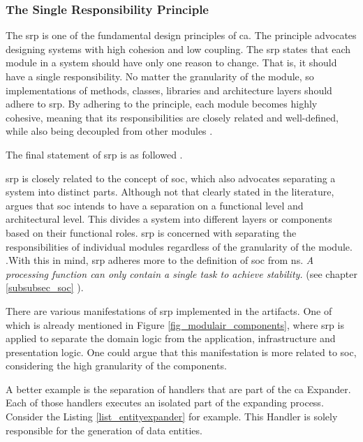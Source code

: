 \subsubsection{The Single Responsibility Principle} \label{subsubsec_srp}

The \gls{srp} is one of the fundamental design principles of \gls{ca}. The principle
advocates designing systems with high cohesion and low coupling. The \gls{srp} states that
each module in a system should have only one reason to change. That is, it should have a
single responsibility. No matter the granularity of the module, so implementations of
methods, classes, libraries and architecture layers should adhere to \gls{srp}. By
adhering to the principle, each module becomes highly cohesive, meaning that its
responsibilities are closely related and well-defined, while also being decoupled from
other modules \parencite[81]{robert_c_martin_clean_2018}.

The final statement of \gls{srp} is as followed
\parencite[82]{robert_c_martin_clean_2018}.


\gls{srp} is closely related to the concept of \gls{soc}, which also advocates separating
a system into distinct parts. Although not that clearly stated in the literature,
\citeauthor{robert_c_martin_clean_2018} argues that \gls{soc} intends to have a separation
on a functional level and architectural level. This divides a system into different layers
or components based on their functional roles. \gls{srp} is concerned with separating the
responsibilities of individual modules regardless of the granularity of the module.
\parencite[205]{robert_c_martin_clean_2018}.With this in mind, \gls{srp} adheres more to
the definition of \gls{soc} from \gls{ns}. \textit{A processing function can only contain
a single task to achieve stability.} (see chapter \ref{subsubsec_soc}
).

There are various manifestations of \gls{srp} implemented in the artifacts. One of which is
already mentioned in Figure \ref{fig_modulair_components}, where \gls{srp} is applied to
separate the domain logic from the application, infrastructure and presentation logic. One
could argue that this manifestation is more related to \gls{soc}, considering the high
granularity of the components.

A better example is the separation of handlers that are part of the \gls{ca}
Expander. Each of those handlers executes an isolated part of the expanding process.
Consider the Listing \ref{list_entityexpander} 
\parencite{koks_expandentitieshandlerinteractor_2023} for example. This Handler is solely
responsible for the generation of data entities. 

